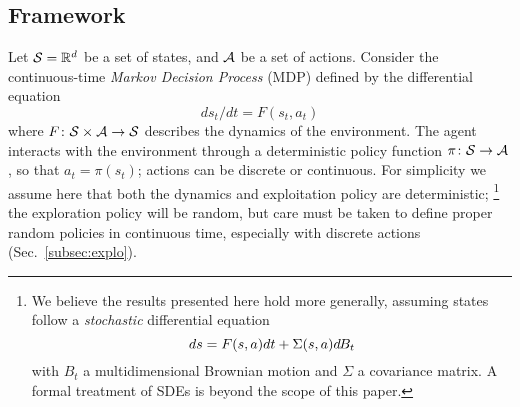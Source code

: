 \subsection{Framework}





      
Let ${\cal S} = \mathbb{R}^d$ be a set of states, and ${\cal A}$ be a set of
actions. Consider the continuous-time \emph{Markov Decision Process} (MDP) defined by the differential equation %
        \begin{equation}
	\label{eq:diffusion}
	ds_t/dt = F(s_t, a_t) %
              \end{equation}
where $F\colon {\cal S}\times{\cal A}\rightarrow {\cal S}$ describes
the dynamics of the environment. The agent interacts with the environment through a deterministic policy function
$\pi \colon {\cal S} \rightarrow {\cal A}$, so that $a_t=\pi(s_t)$;
actions can be discrete or continuous. 
For simplicity we assume here that both the dynamics and exploitation policy are
deterministic; \footnote{
      We believe the results presented here hold more
      generally, assuming states
      follow a \emph{stochastic} differential equation \begin{equation}
	      ds = F(s, a)dt  + \Sigma(s, a)d\hspace{-.1em}B_t
	      \label{eq:sde}
      \end{equation} with
      $B_t$ a multidimensional Brownian motion and $\Sigma$ a covariance matrix. A
      formal treatment of SDEs is beyond the scope of this paper.}
 the exploration policy will be random, but care must be
taken to define proper random policies 
in continuous time, especially with discrete actions (Sec.~\ref{subsec:explo}).

